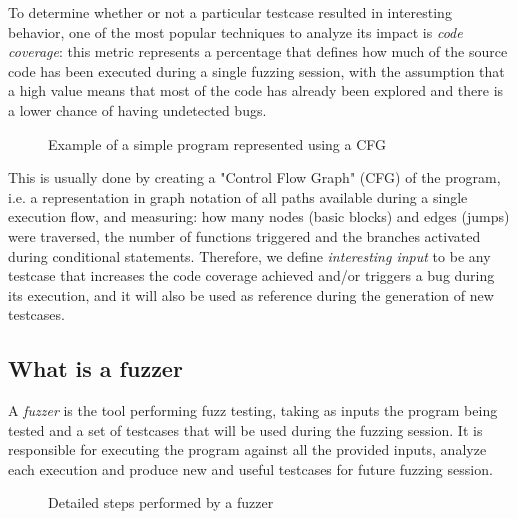 To determine whether or not a particular testcase resulted in interesting behavior, one of the most popular techniques to analyze its impact is \textit{code coverage}: this metric represents a percentage that defines how much of the source code has been executed during a single fuzzing session, with the assumption that a high value means that most of the code has already been explored and there is a lower chance of having undetected bugs.

\begin{figure}[h]
\caption{Example of a simple program represented using a CFG}
\label{fig:cfg}
\end{figure}

This is usually done by creating a "Control Flow Graph" (CFG) of the program, i.e. a representation in graph notation of all paths available during a single execution flow, and measuring: how many nodes (basic blocks) and edges (jumps) were traversed, the number of functions triggered and the branches activated during conditional statements.
Therefore, we define \textit{interesting input} to be any testcase that increases the code coverage achieved and/or triggers a bug during its execution, and it will also be used as reference during the generation of new testcases.






\newpage
\subsection{What is a fuzzer}  \label{fuzzers}
A \textit{fuzzer} is the tool performing fuzz testing, taking as inputs the program being tested and a set of testcases that will be used during the fuzzing session. It is responsible for executing the program against all the provided inputs, analyze each execution and produce new and useful testcases for future fuzzing session.

\begin{figure}[h]
\caption{Detailed steps performed by a fuzzer}
\label{fuzzing_steps}
\end{figure}

